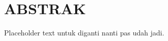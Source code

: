 \documentclass[main]{subfiles}
\begin{document}
\chapter*{ABSTRAK}
Placeholder text untuk diganti nanti pas udah jadi.
\end{document}
